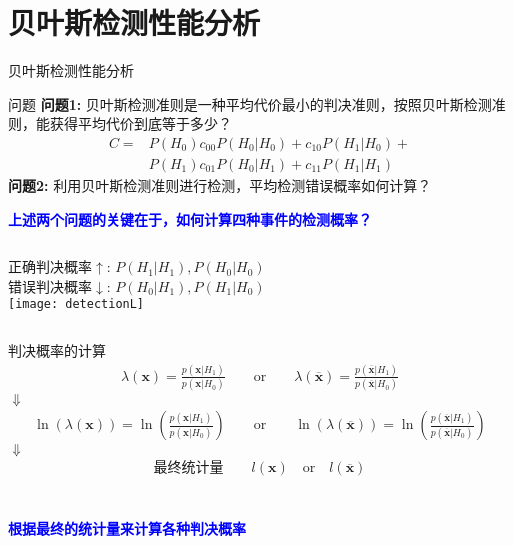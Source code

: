 \section{贝叶斯检测性能分析}

\begin{frame}{贝叶斯检测性能分析}
\begin{block}{问题}
	\textbf{问题1:} 贝叶斯检测准则是一种平均代价最小的判决准则，按照贝叶斯检测准则，能获得平均代价到底等于多少？
	\begin{align*}
	C=&P(H_0)c_{00}P(H_0|H_0)+c_{10}P(H_1|H_0)+\\
	&P(H_1)c_{01}P(H_0|H_1)+c_{11}P(H_1|H_1)
	\end{align*}
	\textbf{问题2:} 利用贝叶斯检测准则进行检测，平均检测错误概率如何计算？
\end{block}
\textbf{\textcolor{blue}{上述两个问题的关键在于，如何计算四种事件的检测概率？}}
\begin{columns}
	正确判决概率$\uparrow$: $P(H_1|H_1), P(H_0|H_0)$\\
	错误判决概率$\downarrow$: $P(H_0|H_1), P(H_1|H_0)$\\
	\texttt{[image: detectionL]}
\end{columns}
\end{frame}

\begin{frame}{判决概率的计算}
\begin{align*}
\lambda(\bm{x})=\frac{p(\bm{x}|H_1)}{p(\bm{x}|H_0)}\qquad \text{or}\qquad \lambda(\bm{\overline{x}})=\frac{p(\bm{\overline{x}}|H_1)}{p(\bm{\overline{x}}|H_0)}
\end{align*}
\centering $\Downarrow$
\begin{align*}
\ln(\lambda(\bm{x}))=\ln\left(\frac{p(\bm{x}|H_1)}{p(\bm{x}|H_0)}\right)\qquad \text{or}\qquad \ln(\lambda(\bm{\overline{x}}))=\ln\left(\frac{p(\bm{\overline{x}}|H_1)}{p(\bm{\overline{x}}|H_0)}\right)
\end{align*}
\centering $\Downarrow$
\begin{align*}
\textbf{最终统计量}\qquad l(\bm{x})\quad \text{or}\quad l(\bm{\overline{x}})
\end{align*}\\
~\\
\textbf{\textcolor{blue}{根据最终的统计量来计算各种判决概率}}
\end{frame}

